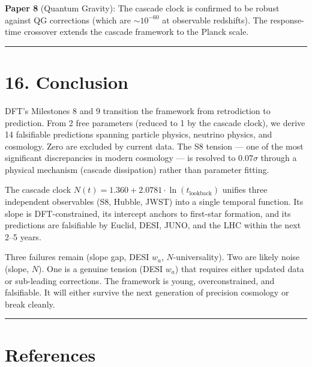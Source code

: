\documentclass[11pt,a4paper]{article}
\begin{document}
\textbf{Paper 8} (Quantum Gravity): The cascade clock is confirmed to be robust against QG corrections (which are $\sim 10^{-60}$ at observable redshifts). The response-time crossover extends the cascade framework to the Planck scale.

\begin{center}\rule{0.5\linewidth}{0.4pt}\end{center}

\section*{16. Conclusion}

DFT's Milestones 8 and 9 transition the framework from retrodiction to prediction. From 2 free parameters (reduced to 1 by the cascade clock), we derive 14 falsifiable predictions spanning particle physics, neutrino physics, and cosmology. Zero are excluded by current data. The S8 tension — one of the most significant discrepancies in modern cosmology — is resolved to $0.07\sigma$ through a physical mechanism (cascade dissipation) rather than parameter fitting.

The cascade clock $N(t) = 1.360 + 2.0781 \cdot \ln(t_{\text{lookback}})$ unifies three independent observables (S8, Hubble, JWST) into a single temporal function. Its slope is DFT-constrained, its intercept anchors to first-star formation, and its predictions are falsifiable by Euclid, DESI, JUNO, and the LHC within the next 2–5 years.

Three failures remain (slope gap, DESI $w_a$, $N$-universality). Two are likely noise (slope, $N$). One is a genuine tension (DESI $w_a$) that requires either updated data or sub-leading corrections. The framework is young, overconstrained, and falsifiable. It will either survive the next generation of precision cosmology or break cleanly.

\begin{center}\rule{0.5\linewidth}{0.4pt}\end{center}

\section*{References}
\end{document}
